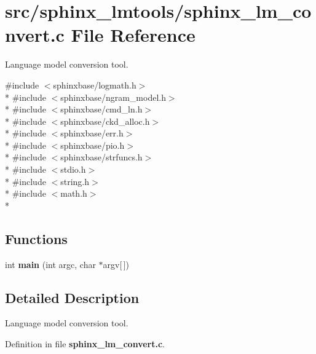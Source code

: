 \section{src/sphinx\-\_\-lmtools/sphinx\-\_\-lm\-\_\-convert.c File Reference}
\label{sphinx__lm__convert_8c}


Language model conversion tool.  


{\ttfamily \#include $<$sphinxbase/logmath.\-h$>$}\\*
{\ttfamily \#include $<$sphinxbase/ngram\-\_\-model.\-h$>$}\\*
{\ttfamily \#include $<$sphinxbase/cmd\-\_\-ln.\-h$>$}\\*
{\ttfamily \#include $<$sphinxbase/ckd\-\_\-alloc.\-h$>$}\\*
{\ttfamily \#include $<$sphinxbase/err.\-h$>$}\\*
{\ttfamily \#include $<$sphinxbase/pio.\-h$>$}\\*
{\ttfamily \#include $<$sphinxbase/strfuncs.\-h$>$}\\*
{\ttfamily \#include $<$stdio.\-h$>$}\\*
{\ttfamily \#include $<$string.\-h$>$}\\*
{\ttfamily \#include $<$math.\-h$>$}\\*
\subsection*{Functions}
\begin{DoxyCompactItemize}
\item 
int {\bfseries main} (int argc, char $\ast$argv[$\,$])\label{sphinx__lm__convert_8c_a0ddf1224851353fc92bfbff6f499fa97}

\end{DoxyCompactItemize}


\subsection{Detailed Description}
Language model conversion tool. 

Definition in file {\bf sphinx\-\_\-lm\-\_\-convert.\-c}.

